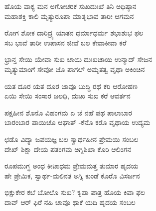 
\begin{myquote}
ಹೊಯ ವಾಕ್ಯ ಮನ ಅಗೋಚರಕ ಸುಖದುಃಖೆ ತಿನಿ ಅಧಿಷ್ಠಾನ\\ಮಹಾಶಕ್ತಿ ಕಾಲಿ ಮೃತ್ಯುರೂಪಾ ಮಾತೃಭಾವ ತಾರೀ ಆಗಮನ
\end{myquote}


\begin{myquote}
ರೋಗ ಶೋಕ ದಾರಿದ್ರ್ಯ ಯಾತನ ಧರ್ಮಾಧರ್ಮ ಶಭಾಶುಭ ಫಲ\\ಸಬ ಭಾವೆ ತಾರೀ ಉಪಾಸನ ಜೀವೆ ಬಲ ಕೇವಾಕೀವಾ ಕರೆ
\end{myquote}


\begin{myquote}
ಭ್ರಾನ್ತ ಸೇಯಿ ಯೇವಾ ಸುಖ ಚಾಯಿ ದುಃಖಚಾಯಿ ಉನ್ಮಾದ್ ಸೇಜನ\\ಮೃತ್ಯುಮಾಂಗೆ ಸೇವೋ ಜೊ ಪಾಗಲ್ ಅಮೃತತ್ವ ವೃಥಾ ಅಕಿಂಚಿನ
\end{myquote}


\begin{myquote}
ಯತ ದೂರ ಯತ ದೂರ ಜಾವೂ ಬುದ್ಧಿ ರಥೆ ಕರಿ ಆರೋಹಣ\\ಏಯಿ ಸೇಯಿ ಸಂಸಾರ ಜಲಧಿ, ದುಃಖ ಸುಖ ಕರೆ ಆವರ್ತನ
\end{myquote}


\begin{myquote}
ಪಕ್ಷಹೀನ ಶೊನೊ ವಿಹಂಗಮ ಏ ಜೆ ನಹೆ ಪಥ ಪಾಲಾಬಾರ\\ಬಾರಂಬಾರ ಪಾಯಿಚೊ ಆಘಾತ್ -ಕೆನೊ ಕರೊ ವೃಥಾಯ ಉದ್ಯಮ
\end{myquote}


\begin{myquote}
ಛಡೊ ವಿದ್ಯಾ ಜಪಯಜ್ಞ ಬಲ ಸ್ವಾರ್ಥಹೀನ ಪ್ರೇಮಯಿ ಸಂಬಲ\\ದೇಖ್ ಶಿಕ್ಷಾ ದೇಯ ಪತಂಗಮ ಅಗ್ನಿಶಿಖಾ ಕೊರಿ ಆಲಿಂಗನ
\end{myquote}


\begin{myquote}
ರೂಪಮುಗ್ಧ ಅಂಧ ಕೀಟಾಧಮ ಪ್ರೇಮಮತ್ತ ತುಮಾರ ಹೃದಯ\\ಹೇ ಪ್ರೇಮಿಕ, ಸ್ವಾರ್ಥ-ಮಲಿನತ ಅಗ್ನಿ ಕುಂಡೆ ಕೊರೊ ವಿಸರ್ಜನ
\end{myquote}


\begin{myquote}
ಭಿಕ್ಷುಕೇರ ಕಬೆ ಬೋಲೊ ಸುಖ? ಕೃಪಾ ಪಾತ್ರ ಹೊಯ ಕಿವಾ ಫಲ\\ದಾವ್ ಆರ್ ಫಿರೆ ನಹಿ ಚಾವೊ ಥಾಕೆ ಯದಿ ಹೃದಯ ಸಂಬಲ
\end{myquote}

